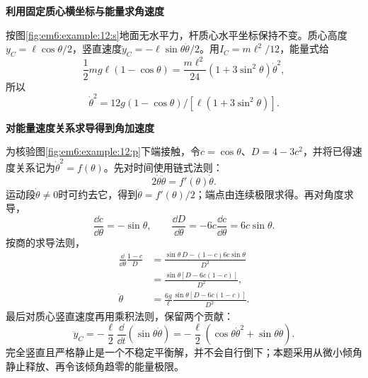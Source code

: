 \begin{solution}\textbf{利用固定质心横坐标与能量求角速度}\par\nobreak
按图\ref{fig:em6:example:12:s}地面无水平力，杆质心水平坐标保持不变。质心高度$y_C=\ell\cos\theta/2$，竖直速度$\dot y_C=-\ell\sin\theta\dot\theta/2$。用$I_C=m\ell^2/12$，能量式给
\[\frac12mg\ell(1-\cos\theta)=\frac{m\ell^2}{24}(1+3\sin^2\theta)\dot\theta^2,\]
所以
\[\boxed{\dot\theta^2=12g(1-\cos\theta)/[\ell(1+3\sin^2\theta)]}.\]




\par\medskip{}\noindent\textbf{对能量速度关系求导得到角加速度}\par\nobreak
为核验图\ref{fig:em6:example:12:p}下端接触，令$c=\cos\theta$、$D=4-3c^2$，并将已得速度关系记为$\dot\theta^2=f(\theta)$。先对时间使用链式法则：
\[
 2\dot\theta\ddot\theta=f'(\theta)\dot\theta.
\]
运动段$\dot\theta\ne0$时可约去它，得到$\ddot\theta=f'(\theta)/2$；端点由连续极限求得。再对角度求导，
\[
 \frac{\dd c}{\dd\theta}=-\sin\theta,
 \qquad
 \frac{\dd D}{\dd\theta}=-6c\frac{\dd c}{\dd\theta}=6c\sin\theta.
\]
按商的求导法则，
\[
 \begin{aligned}
 \frac{\dd}{\dd\theta}\frac{1-c}{D}
 &=\frac{\sin\theta\,D-(1-c)6c\sin\theta}{D^2}\\
 &=\frac{\sin\theta[D-6c(1-c)]}{D^2},\\
 \ddot\theta&=\frac{6g}{\ell}\frac{\sin\theta[D-6c(1-c)]}{D^2}.
 \end{aligned}
\]
最后对质心竖直速度再用乘积法则，保留两个贡献：
\[
 \ddot y_C=-\frac\ell2\frac{\dd}{\dd t}(\sin\theta\dot\theta)
 =-\frac\ell2\left(\cos\theta\dot\theta^2+\sin\theta\ddot\theta\right).
\]
完全竖直且严格静止是一个不稳定平衡解，并不会自行倒下；本题采用从微小倾角静止释放、再令该倾角趋零的能量极限。




\end{solution}
